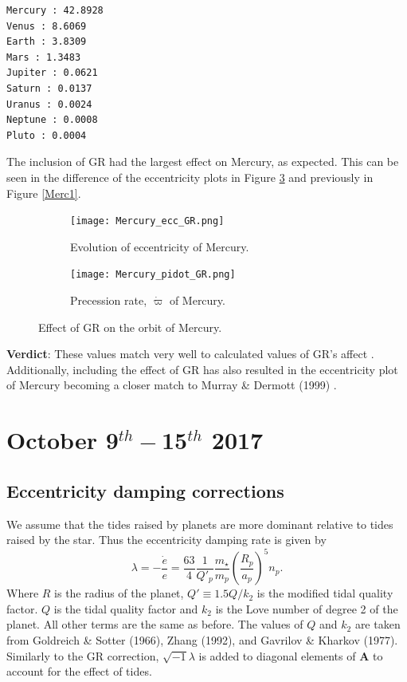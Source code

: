 \documentclass[11pt, oneside]{article}   	%
\begin{document}
\begin{verbatim}
Mercury : 42.8928
Venus : 8.6069 
Earth : 3.8309
Mars : 1.3483 
Jupiter : 0.0621 
Saturn : 0.0137 
Uranus : 0.0024 
Neptune : 0.0008 
Pluto : 0.0004 
\end{verbatim}

The inclusion of GR had the largest effect on Mercury, as expected. This can be seen in the difference of the eccentricity plots in Figure \ref{Merc2} and previously in Figure \ref{Merc1}.

\begin{figure}[!h]
    \centering
    \begin{subfigure}[t]{0.49\textwidth}
    \captionsetup{width=0.9\textwidth}
	\centering
       	 \texttt{[image: Mercury\_ecc\_GR.png]}
       	 \caption{Evolution of eccentricity of Mercury.}
        	\label{}
    \end{subfigure}
    \begin{subfigure}[t]{0.49\textwidth}
    \captionsetup{width=0.9\textwidth}
        	\centering
	\texttt{[image: Mercury\_pidot\_GR.png]}
        	\caption{Precession rate, $\dot{\varpi}$ of Mercury.}
        	\label{fig:pidot}
    \end{subfigure}
    \caption{Effect of GR on the orbit of Mercury.}
    \label{Merc2}
\end{figure}

\textbf{Verdict}: These values match very well to calculated values of GR's affect \cite{GRpidot}. Additionally, including the effect of GR has also resulted in the eccentricity plot of Mercury becoming a closer match to Murray \& Dermott (1999) \cite{ssd}.

\newpage

\section{October 9$^{th} - $15$^{th}$ 2017}

\subsection{Eccentricity damping corrections}

We assume that the tides raised by planets are more dominant relative to tides raised by the star. Thus the eccentricity damping rate is given by \cite{ssd, Zhang2013}
\begin{equation}
\lambda = -\frac{\dot{e}}{e} = \frac{63}{4} \frac{1}{Q{}'_{p}}\frac{m_{\star}}{m_{p}} \left (\frac{R_{p}}{a_{p}} \right)^{5} n_{p}.
\end{equation}
Where $R$ is the radius of the planet, $Q{}' \equiv 1.5Q/k_{2}$ is the modified tidal quality factor. $Q$ is the tidal quality factor and $k_{2}$ is the Love number of degree 2 of the planet. All other terms are the same as before. The values of $Q$ and $k_{2}$ are taken from Goldreich \& Sotter (1966)\cite{Goldreich1966}, Zhang (1992)\cite{Zhang1992}, and Gavrilov \& Kharkov (1977)\cite{Gavrilov1977}. Similarly to the GR correction, $\sqrt{-1}\lambda$ is added to diagonal elements of $\mathbf{A}$ to account for the effect of tides.
\end{document}
